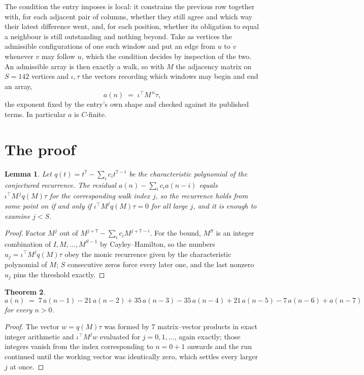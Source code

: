 \documentclass[11pt,a4paper]{article}
\theoremstyle{plain}
\newtheorem{theorem}{Theorem}
\newtheorem{lemma}[theorem]{Lemma}
\theoremstyle{definition}
\begin{document}
The condition the entry imposes is local: it constrains the previous row together with, for each adjacent pair of columns, whether they still agree and which way their latest difference went, and, for each position, whether its obligation to equal a neighbour is still outstanding and nothing beyond. Take as
vertices the admissible configurations of one such window and put an edge from $u$ to $v$
whenever $v$ may follow $u$, which the condition decides by inspection of the two. An
admissible array is then exactly a walk, so with $M$ the adjacency matrix on $S=142$ vertices
and $\iota,\tau$ the vectors recording which windows may begin and end an array,
\[
a(n)\;=\;\iota^{\!\top}M^{\,n}\tau ,
\]
the exponent fixed by the entry's own shape and checked against its published terms. In
particular $a$ is $C$-finite.

\section{The proof}

\begin{lemma}\label{lem:crit}
Let $q(t)=t^{7}-\sum_i c_it^{7-i}$ be the characteristic polynomial of the
conjectured recurrence. The residual $a(n)-\sum_ic_ia(n-i)$ equals
$\iota^{\!\top}M^{\,j}q(M)\tau$ for the corresponding walk index $j$, so the recurrence
holds from some point on if and only if $\iota^{\!\top}M^{j}q(M)\tau=0$ for all large $j$,
and it is enough to examine $j<S$.
\end{lemma}

\begin{proof}
Factor $M^{j}$ out of $M^{j+7}-\sum_ic_iM^{j+7-i}$. For the bound, $M^{S}$
is an integer combination of $I,M,\dots,M^{S-1}$ by Cayley--Hamilton, so the numbers
$u_j=\iota^{\!\top}M^{j}q(M)\tau$ obey the monic recurrence given by the characteristic
polynomial of $M$; $S$ consecutive zeros force every later one, and the last nonzero $u_j$
pins the threshold exactly.
\end{proof}

\begin{theorem}
\[
a(n)\;=\;7\,a(n-1) - 21\,a(n-2) + 35\,a(n-3) - 35\,a(n-4) + 21\,a(n-5) - 7\,a(n-6) + a(n-7)
\]
for every $n>0$.
\end{theorem}

\begin{proof}
The vector $w=q(M)\tau$ was formed by $7$ matrix--vector products in exact integer
arithmetic and $\iota^{\!\top}M^{j}w$ evaluated for $j=0,1,\dots$, again exactly; those
integers vanish from the index corresponding to $n=0+1$ onwards and the run continued
until the working vector was identically zero, which settles every larger $j$ at once.
\end{proof}
\end{document}
